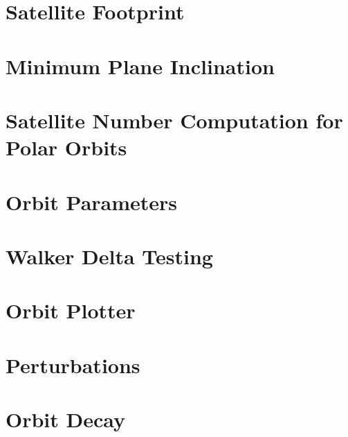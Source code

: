 
\section{Satellite Footprint}
\label{SatFootprint}



\section{Minimum Plane Inclination}
\label{MinimumInclination}


\section{Satellite Number Computation for Polar Orbits}
\label{SatNumberPolar}


\section{Orbit Parameters}
\label{OrbitParameters}





\section{Walker Delta Testing}
\label{smartWD}


\section{Orbit Plotter}
\label{OrbitPlotter}






\section{Perturbations}
\label{Perturbation}



\section{Orbit Decay}
\label{OrbitDecay}



